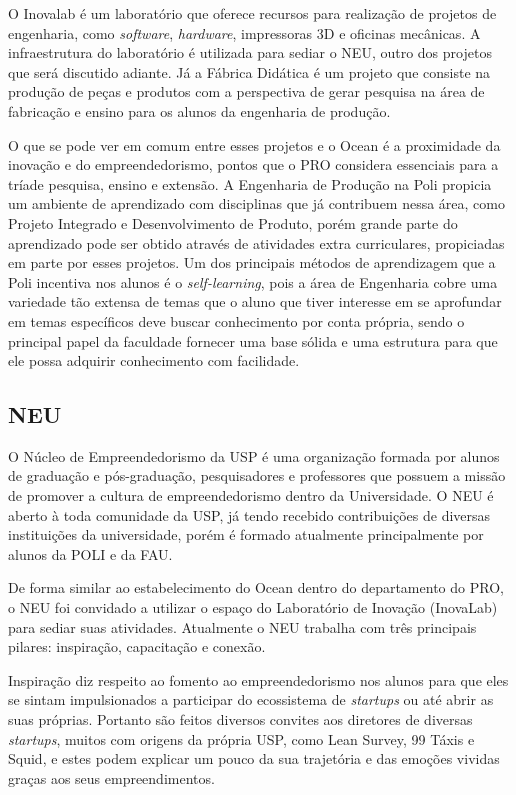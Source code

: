 O Inovalab é um laboratório que oferece recursos para realização de projetos de engenharia, como \textit{software}, \textit{hardware}, impressoras 3D e oficinas mecânicas. A infraestrutura do laboratório é utilizada para sediar o NEU, outro dos projetos que será discutido adiante. Já a Fábrica Didática é um projeto que consiste na produção de peças e produtos com a perspectiva de gerar pesquisa na área de fabricação e ensino para os alunos da engenharia de produção.

O que se pode ver em comum entre esses projetos e o Ocean é a proximidade da inovação e do empreendedorismo, pontos que o PRO considera essenciais para a tríade pesquisa, ensino e extensão. A Engenharia de Produção na Poli propicia um ambiente de aprendizado com disciplinas que já contribuem nessa área, como Projeto Integrado e Desenvolvimento de Produto, porém grande parte do aprendizado pode ser obtido através de atividades extra curriculares, propiciadas em parte por esses projetos. Um dos principais métodos de aprendizagem que a Poli incentiva nos alunos é o \textit{self-learning}, pois a área de Engenharia cobre uma variedade tão extensa de temas que o aluno que tiver interesse em se aprofundar em temas específicos deve buscar conhecimento por conta própria, sendo o principal papel da faculdade fornecer uma base sólida e uma estrutura para que ele possa adquirir conhecimento com facilidade.

\subsection{NEU}
\label{sec:con_neu}

O Núcleo de Empreendedorismo da USP é uma organização formada por alunos de graduação e pós-graduação, pesquisadores e professores que possuem a missão de promover a cultura de empreendedorismo dentro da Universidade. O NEU é aberto à toda comunidade da USP, já tendo recebido contribuições de diversas instituições da universidade, porém é formado atualmente principalmente por alunos da POLI e da FAU.

De forma similar ao estabelecimento do Ocean dentro do departamento do PRO, o NEU foi convidado a utilizar o espaço do Laboratório de Inovação (InovaLab) para sediar suas atividades. Atualmente o NEU trabalha com três principais pilares: inspiração, capacitação e conexão.

Inspiração diz respeito ao fomento ao empreendedorismo nos alunos para que eles se sintam impulsionados a participar do ecossistema de \textit{startups} ou até abrir as suas próprias. Portanto são feitos diversos convites aos diretores de diversas \textit{startups}, muitos com origens da própria USP, como Lean Survey, 99 Táxis e Squid, e estes podem explicar um pouco da sua trajetória e das emoções vividas graças aos seus empreendimentos. 

